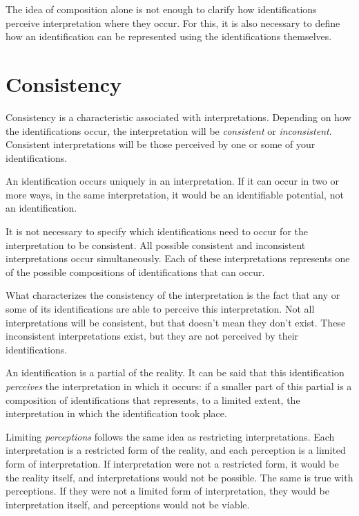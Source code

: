 \documentclass[11pt]{article}
\begin{document}
	The idea of composition alone is not enough to clarify how identifications perceive interpretation where they occur. For this, it is also necessary to define how an identification can be represented using the identifications themselves.

	\section{Consistency} \label{pt-s5}
	
	Consistency is a characteristic associated with interpretations. Depending on how the identifications occur, the interpretation will be \textit{consistent} or \textit{inconsistent}. Consistent interpretations will be those perceived by one or some of your identifications.
	
	An identification occurs uniquely in an interpretation. If it can occur in two or more ways, in the same interpretation, it would be an identifiable potential, not an identification.
	
	It is not necessary to specify which identifications need to occur for the interpretation to be consistent. All possible consistent and inconsistent interpretations occur simultaneously. Each of these interpretations represents one of the possible compositions of identifications that can occur.
	
	What characterizes the consistency of the interpretation is the fact that any or some of its identifications are able to perceive this interpretation. Not all interpretations will be consistent, but that doesn't mean they don't exist. These inconsistent interpretations exist, but they are not perceived by their identifications.
	
	An identification is a partial of the reality. It can be said that this identification \textit{perceives} the interpretation in which it occurs: if a smaller part of this partial is a composition of identifications that represents, to a limited extent, the interpretation in which the identification took place.
	
	Limiting \textit{perceptions} follows the same idea as restricting interpretations. Each interpretation is a restricted form of the reality, and each perception is a limited form of interpretation. If interpretation were not a restricted form, it would be the reality itself, and interpretations would not be possible. The same is true with perceptions. If they were not a limited form of interpretation, they would be interpretation itself, and perceptions would not be viable.
	
\end{document}
